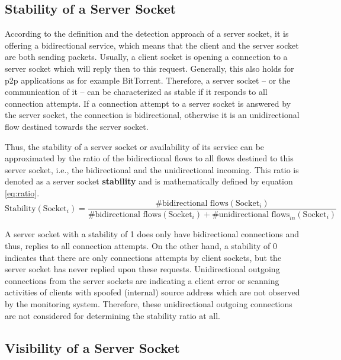 \subsection{Stability of a Server Socket}
According to the definition and the detection approach of a \gls{server socket}, it is offering a bidirectional service, which means that the client and the \gls{server socket} are both sending packets. 
Usually, a client socket is opening a connection to a \gls{server socket} which will reply then to this request. 
Generally, this also holds for \gls{p2p} applications as for example BitTorrent. Therefore, a \gls{server socket} -- or the communication of it -- can be characterized as stable if it responds to all connection attempts. 
If a connection attempt to a \gls{server socket} is answered by the \gls{server socket}, the connection is bidirectional, otherwise it is an unidirectional flow destined towards the \gls{server socket}.

Thus, the stability of a \gls{server socket} or availability of its service can be approximated by the ratio of the bidirectional flows to all flows destined to this \gls{server socket}, i.e., the bidirectional and the unidirectional incoming. 
This ratio is denoted as a \gls{server socket} \textbf{stability} and is mathematically defined by equation \ref{eq:ratio}.
\begin{equation}
	\text{Stability}(\text{Socket}_i) = \frac{\text{\#bidirectional flows}(\text{Socket}_i)}{\text{\#bidirectional flows}(\text{Socket}_i) + \text{\#unidirectional flows}_{in}(\text{Socket}_i)}
	\label{eq:ratio}
\end{equation}

A \gls{server socket} with a stability of 1 does only have bidirectional connections and thus, replies to all connection attempts. 
On the other hand, a stability of 0 indicates that there are only connections attempts by client sockets, but the \gls{server socket} has never replied upon these requests. 
Unidirectional outgoing connections from the \glspl{server socket} are indicating a client error or scanning activities of clients with spoofed (internal) source address which are not observed by the monitoring system. 
Therefore, these unidirectional outgoing connections are not considered for determining the stability ratio at all.

\subsection{Visibility of a Server Socket\label{subsection:visibility}}

